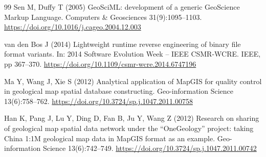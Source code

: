 \documentclass[11pt,a4paper]{article}
\begin{document}
\begin{thebibliography}{99}
Sen M, Duffy T (2005) GeoSciML: development of a generic GeoScience Markup Language. Computers \& Geosciences 31(9):1095--1103. \url{https://doi.org/10.1016/j.cageo.2004.12.003}

van den Bos J (2014) Lightweight runtime reverse engineering of binary file format variants. In: 2014 Software Evolution Week -- IEEE CSMR-WCRE. IEEE, pp 367--370. \url{https://doi.org/10.1109/csmr-wcre.2014.6747196}

Ma Y, Wang J, Xie S (2012) Analytical application of MapGIS for quality control in geological map spatial database constructing. Geo-information Science 13(6):758--762. \url{https://doi.org/10.3724/sp.j.1047.2011.00758}

Han K, Pang J, Lu Y, Ding D, Fan B, Ju Y, Wang Z (2012) Research on sharing of geological map spatial data network under the ``OneGeology'' project: taking China 1:1M geological map data in MapGIS format as an example. Geo-information Science 13(6):742--749. \url{https://doi.org/10.3724/sp.j.1047.2011.00742}
\end{thebibliography}
\end{document}

